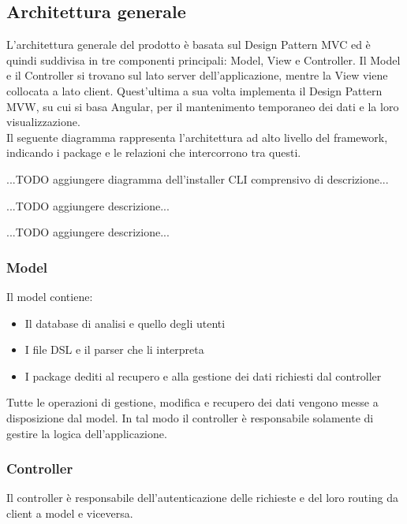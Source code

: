 \subsection{Architettura generale}
L’architettura generale del prodotto è basata sul Design Pattern MVC ed è quindi suddivisa in tre componenti principali: Model, View e Controller. Il Model e il Controller si trovano sul lato server dell’applicazione, mentre la View viene collocata a lato client. Quest’ultima a sua volta implementa il Design Pattern MVW, su cui si basa Angular, per il mantenimento temporaneo dei dati e la loro visualizzazione.\\

Il seguente diagramma rappresenta l'architettura ad alto livello del framework, indicando i package e le relazioni che intercorrono tra questi.

...TODO aggiungere diagramma dell'installer CLI comprensivo di descrizione...

...TODO aggiungere descrizione...

...TODO aggiungere descrizione...

\newpage
\subsubsection{Model}
Il model contiene:
\begin{itemize}
\item Il database di analisi e quello degli utenti
\item I file DSL e il parser che li interpreta
\item I package dediti al recupero e alla gestione dei dati richiesti dal controller
\end{itemize}
Tutte le operazioni di gestione, modifica e recupero dei dati vengono messe a disposizione dal model. In tal modo il controller è responsabile solamente di gestire la logica dell’applicazione.

\subsubsection{Controller}
Il controller è responsabile dell’autenticazione delle richieste e del loro routing da client a model e viceversa.


